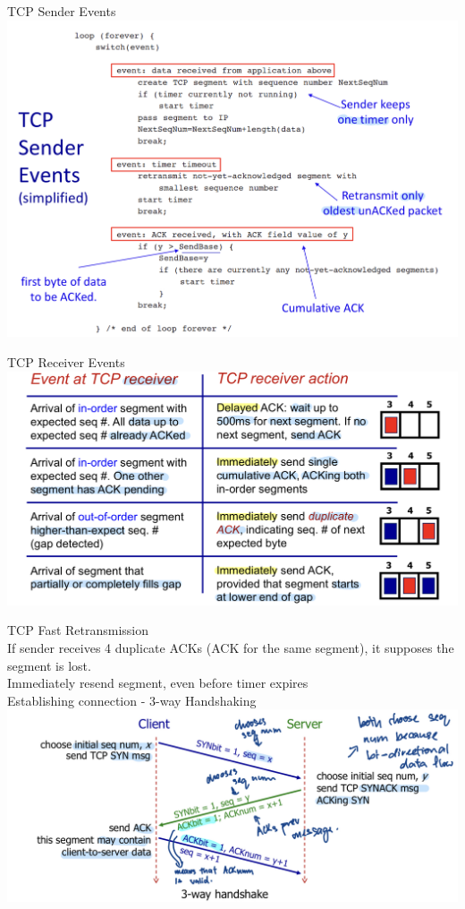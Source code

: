 \documentclass[10pt, a4paper]{article}
\newcommand{\blue}[1]{{\color{MidnightBlue}#1}}
\begin{document}
\begin{multicols*}{3}
		TCP Sender Events\\
		\includegraphics[scale=.17]{./assets/tcpSenderEvents}

		TCP Receiver Events\\
		\includegraphics[scale=.15]{./assets/tcpReceiverEvents}

		TCP Fast Retransmission\\
		If sender receives \blue{4 duplicate ACKs} (ACK for the same segment), it supposes the segment is lost.\\
		Immediately resend segment, even before timer expires\\

		Establishing connection - 3-way Handshaking\\
		\includegraphics[scale=.15]{./assets/tcpHandshaking}


\end{multicols*}
\end{document}
